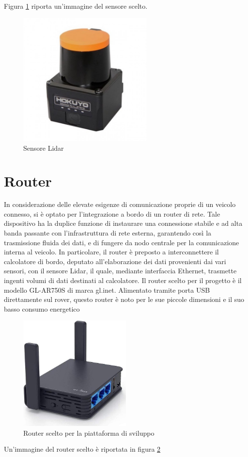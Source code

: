 Figura \ref{Sensore Lidar} riporta un'immagine del sensore scelto.

\begin{figure}
  \centering
  \includegraphics[width=0.6\textwidth]{figures/sensore_hokuio.jpg}
  \caption{Sensore Lidar}
  \label{Sensore Lidar}
\end{figure}

\section{Router}
In considerazione delle elevate esigenze di comunicazione proprie di un veicolo connesso, si è optato per l'integrazione a bordo di un router di rete. Tale dispositivo ha la duplice funzione di instaurare una connessione stabile e ad alta banda passante con l'infrastruttura di rete esterna, garantendo così la trasmissione fluida dei dati, e di fungere da nodo centrale per la comunicazione interna al veicolo. In particolare, il router è preposto a interconnettere il calcolatore di bordo, deputato all'elaborazione dei dati provenienti dai vari sensori, con il sensore Lidar, il quale, mediante interfaccia Ethernet, trasmette ingenti volumi di dati destinati al calcolatore. Il router scelto per il progetto è il modello GL-AR750S di marca gl.inet. Alimentato tramite porta USB direttamente sul rover, questo router è noto per le sue piccole dimensioni e il suo basso consumo energetico
 
\begin{figure}
  \centering
  \includegraphics[width=0.5\textwidth]{figures/router.jpg}
  \caption{Router scelto per la piattaforma di sviluppo}
  \label{router}
\end{figure}

\noindent Un'immagine del router scelto è riportata in figura \ref{router}